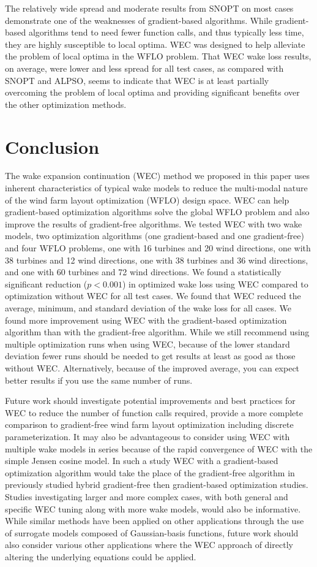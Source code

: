 \documentclass{jpconf}
\begin{document}
The relatively wide spread and moderate results from SNOPT on most cases demonstrate one of the weaknesses of gradient-based algorithms. While gradient-based algorithms tend to need fewer function calls, and thus typically less time, they are highly susceptible to local optima. WEC was designed to help alleviate the problem of local optima in the WFLO problem. That WEC wake loss results, on average, were lower and less spread for all test cases, as compared with SNOPT and ALPSO, seems to indicate that WEC is at least partially overcoming the problem of local optima and providing significant benefits over the other optimization methods.

\section{Conclusion}\label{sec:conclusion}
The wake expansion continuation (WEC) method we proposed in this paper uses inherent characteristics of typical wake models to reduce the multi-modal nature of the wind farm layout optimization (WFLO) design space. WEC can help gradient-based optimization algorithms solve the global WFLO problem and also improve the results of gradient-free algorithms. We tested WEC with two wake models, two optimization algorithms (one gradient-based and one gradient-free) and four WFLO problems, one with 16 turbines and 20 wind directions, one with 38 turbines and 12 wind directions, one with 38 turbines and 36 wind directions, and one with 60 turbines and 72 wind directions. We found a statistically significant reduction ($p<0.001$) in optimized wake loss using WEC compared to optimization without WEC for all test cases. We found that WEC reduced the average, minimum, and standard deviation of the wake loss for all cases. We found more improvement using WEC with the gradient-based optimization algorithm than with the gradient-free algorithm. While we still recommend using multiple optimization runs when using WEC, because of the lower standard deviation fewer runs should be needed to get results at least as good as those without WEC. Alternatively, because of the improved average, you can expect better results if you use the same number of runs.

Future work should investigate potential improvements and best practices for WEC to reduce the number of function calls required, provide a more complete comparison to gradient-free wind farm layout optimization including discrete parameterization. It may also be advantageous to consider using WEC with multiple wake models in series because of the rapid convergence of WEC with the simple Jensen cosine model. In such a study WEC with a gradient-based optimization algorithm would take the place of the gradient-free algorithm in previously studied hybrid gradient-free then gradient-based optimization studies. Studies investigating larger and more complex cases, with both general and specific WEC tuning along with more wake models, would also be informative. While similar methods have been applied on other applications through the use of surrogate models composed of Gaussian-basis functions, future work should also consider various other applications where the WEC approach of directly altering the underlying equations could be applied.
\end{document}

